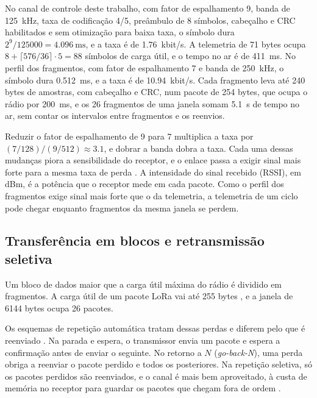 No canal de controle deste trabalho, com fator de espalhamento 9, banda de \SI{125}{\kilo\hertz}, taxa de codificação 4/5, preâmbulo de 8 símbolos, cabeçalho e CRC habilitados e sem otimização para baixa taxa, o símbolo dura $2^9/\num{125000} = \SI{4,096}{\milli\second}$, e a taxa é de \SI{1,76}{kbit/s}. A telemetria de \num{71} bytes ocupa $8 + \lceil 576/36 \rceil \cdot 5 = 88$ símbolos de carga útil, e o tempo no ar é de \SI{411}{\milli\second}. No perfil dos fragmentos, com fator de espalhamento 7 e banda de \SI{250}{\kilo\hertz}, o símbolo dura \SI{0,512}{\milli\second}, e a taxa é de \SI{10,94}{kbit/s}. Cada fragmento leva até \num{240} bytes de amostras, com cabeçalho e CRC, num pacote de \num{254} bytes, que ocupa o rádio por \SI{200}{\milli\second}, e os \num{26} fragmentos de uma janela somam \SI{5,1}{\second} de tempo no ar, sem contar os intervalos entre fragmentos e os reenvios.

Reduzir o fator de espalhamento de 9 para 7 multiplica a taxa por $(7/128)/(9/512) \approx \num{3,1}$, e dobrar a banda dobra a taxa. Cada uma dessas mudanças piora a sensibilidade do receptor, e o enlace passa a exigir sinal mais forte para a mesma taxa de perda \cite{semtech2015}. A intensidade do sinal recebido (RSSI), em dBm, é a potência que o receptor mede em cada pacote. Como o perfil dos fragmentos exige sinal mais forte que o da telemetria, a telemetria de um ciclo pode chegar enquanto fragmentos da mesma janela se perdem.

\subsection{Transferência em blocos e retransmissão seletiva}\label{sec:fund-blocos}

Um bloco de dados maior que a carga útil máxima do rádio é dividido em fragmentos. A carga útil de um pacote LoRa vai até \num{255} bytes \cite{semtech2015}, e a janela de \num{6144} bytes ocupa \num{26} pacotes.

Os esquemas de repetição automática tratam dessas perdas e diferem pelo que é reenviado \cite{lin1984}. Na parada e espera, o transmissor envia um pacote e espera a confirmação antes de enviar o seguinte. No retorno a $N$ (\textit{go-back-N}), uma perda obriga a reenviar o pacote perdido e todos os posteriores. Na repetição seletiva, só os pacotes perdidos são reenviados, e o canal é mais bem aproveitado, à custa de memória no receptor para guardar os pacotes que chegam fora de ordem \cite{lin1984}.


